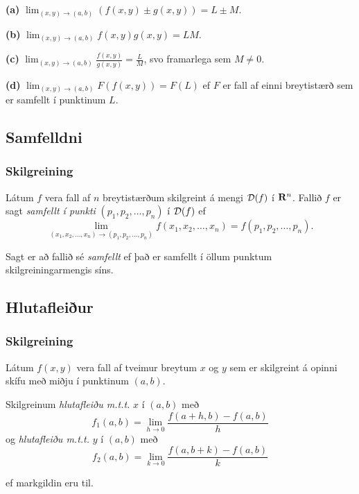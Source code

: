 {\bf (a)}  $\lim_{(x,y)\rightarrow (a,b)}(f(x,y)\pm g(x,y))=L\pm M$.

{\bf (b)}  $\lim_{(x,y)\rightarrow (a,b)}f(x,y) g(x,y)=LM$.

{\bf (c)}  $\lim_{(x,y)\rightarrow (a,b)}\frac{f(x,y)}{g(x,y)}=
\frac{L}{M}$, svo framarlega sem $M\neq 0$.

{\bf (d)}  $\lim_{(x,y)\rightarrow (a,b)}F(f(x,y))=F(L)$ ef $F$ er fall af einni breytistærð sem er samfellt í punktinum $L$.
 
 




\subsection{Samfelldni}
 \subsubsection{Skilgreining }
   Látum $f$ vera fall af $n$ breytistærðum skilgreint á mengi ${\cal D}(f)$ í $\mbox{${\bf R}^n$}$.  Fallið $f$ er sagt {\em samfellt í punkti} 
$(p_1,p_2,\ldots,p_n)$ í ${\cal D}(f)$
ef 
$$\lim_{(x_1,x_2,\ldots,x_n)\rightarrow (p_1,p_2,\ldots,p_n)}
f(x_1,x_2,\ldots,x_n)=f(p_1,p_2,\ldots,p_n).$$

Sagt er að fallið sé {\em samfellt} ef það er samfellt í öllum punktum skilgreiningarmengis síns.

 


\subsection{Hlutafleiður}
\subsubsection{Skilgreining }
 Látum $f(x,y)$ vera fall af tveimur breytum $x$ og $y$ sem er skilgreint á opinni skífu með miðju í punktinum $(a,b)$. 
 
 \medskip
 Skilgreinum \emph{hlutafleiðu m.t.t.} $x$ í $(a,b)$ með
$$f_1(a,b)=\lim_{h\rightarrow 0}\frac{f(a+h,b)-f(a,b)}{h}$$
og \emph{hlutafleiðu m.t.t.} $y$ í $(a,b)$ með
$$f_2(a,b)=\lim_{k\rightarrow 0}\frac{f(a,b+k)-f(a,b)}{k}$$

ef markgildin eru til.


